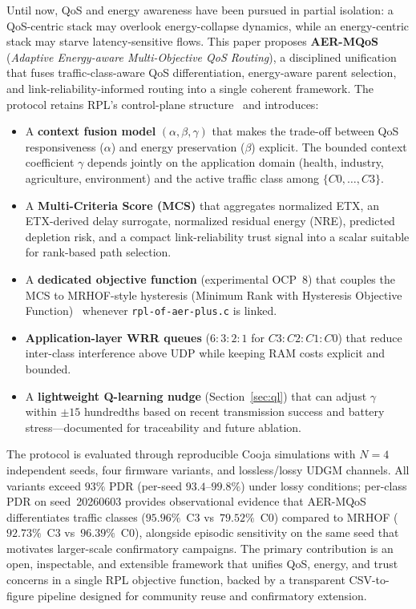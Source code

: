 Until now, QoS and energy awareness have been pursued in partial isolation: a QoS-centric stack may overlook energy-collapse dynamics, while an energy-centric stack may starve latency-sensitive flows. This paper proposes \textbf{AER-MQoS} (\emph{Adaptive Energy-aware Multi-Objective QoS Routing}), a disciplined unification that fuses traffic-class-aware QoS differentiation, energy-aware parent selection, and link-reliability-informed routing into a single coherent framework. The protocol retains RPL's control-plane structure~\cite{rfc6550,rfc9010} and introduces:

\begin{itemize}
  \item A \textbf{context fusion model} $(\alpha,\beta,\gamma)$ that makes the trade-off between QoS responsiveness ($\alpha$) and energy preservation ($\beta$) explicit. The bounded context coefficient $\gamma$ depends jointly on the application domain (health, industry, agriculture, environment) and the active traffic class among $\{C0,\ldots,C3\}$.
  \item A \textbf{Multi-Criteria Score (MCS)} that aggregates normalized ETX, an ETX-derived delay surrogate, normalized residual energy (NRE), predicted depletion risk, and a compact link-reliability trust signal into a scalar suitable for rank-based path selection.
  \item A \textbf{dedicated objective function} (experimental OCP~8) that couples the MCS to MRHOF-style hysteresis (Minimum Rank with Hysteresis Objective Function)~\cite{rfc6719} whenever \texttt{rpl-of-aer-plus.c} is linked.
  \item \textbf{Application-layer WRR queues} ($6{:}3{:}2{:}1$ for $C3{:}C2{:}C1{:}C0$) that reduce inter-class interference above UDP while keeping RAM costs explicit and bounded.
  \item A \textbf{lightweight Q-learning nudge} (Section~\ref{sec:ql}) that can adjust $\gamma$ within $\pm15$ hundredths based on recent transmission success and battery stress---documented for traceability and future ablation.
\end{itemize}

The protocol is evaluated through reproducible Cooja simulations with $N{=}4$ independent seeds, four firmware variants, and lossless/lossy UDGM channels. All variants exceed $93\%$ PDR (per-seed $93.4$--$99.8\%$) under lossy conditions; per-class PDR on seed~20260603 provides observational evidence that AER-MQoS differentiates traffic classes ($95.96\%$~C3 vs~$79.52\%$~C0) compared to MRHOF ($92.73\%$~C3 vs~$96.39\%$~C0), alongside episodic sensitivity on the same seed that motivates larger-scale confirmatory campaigns. The primary contribution is an open, inspectable, and extensible framework that unifies QoS, energy, and trust concerns in a single RPL objective function, backed by a transparent CSV-to-figure pipeline designed for community reuse and confirmatory extension.

